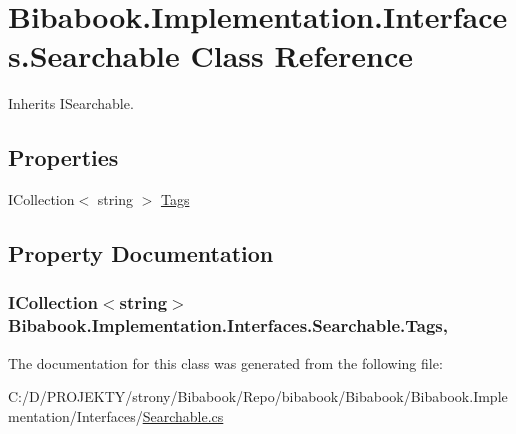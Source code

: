 \hypertarget{class_bibabook_1_1_implementation_1_1_interfaces_1_1_searchable}{}\section{Bibabook.\+Implementation.\+Interfaces.\+Searchable Class Reference}
\label{class_bibabook_1_1_implementation_1_1_interfaces_1_1_searchable}


Inherits I\+Searchable.

\subsection*{Properties}
\begin{DoxyCompactItemize}
\item 
I\+Collection$<$ string $>$ \hyperlink{class_bibabook_1_1_implementation_1_1_interfaces_1_1_searchable_a8cd0c009e3fb0607c0c736d74cd9dbb8}{Tags}
\end{DoxyCompactItemize}


\subsection{Property Documentation}
\hypertarget{class_bibabook_1_1_implementation_1_1_interfaces_1_1_searchable_a8cd0c009e3fb0607c0c736d74cd9dbb8}{}
\subsubsection[{Tags}]{\setlength{\rightskip}{0pt plus 5cm}I\+Collection$<$string$>$ Bibabook.\+Implementation.\+Interfaces.\+Searchable.\+Tags\hspace{0.3cm}{\ttfamily [get]}, {\ttfamily [set]}}\label{class_bibabook_1_1_implementation_1_1_interfaces_1_1_searchable_a8cd0c009e3fb0607c0c736d74cd9dbb8}


The documentation for this class was generated from the following file\+:\begin{DoxyCompactItemize}
\item 
C\+:/\+D/\+P\+R\+O\+J\+E\+K\+T\+Y/strony/\+Bibabook/\+Repo/bibabook/\+Bibabook/\+Bibabook.\+Implementation/\+Interfaces/\hyperlink{_searchable_8cs}{Searchable.\+cs}\end{DoxyCompactItemize}
